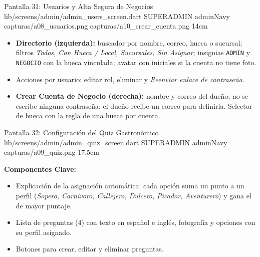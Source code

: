 \pantalladoble
  {Pantalla 31: Usuarios y Alta Segura de Negocios}
  {lib/screens/admin/admin_users_screen.dart}
  {SUPERADMIN}
  {adminNavy}
  {capturas/a08_usuarios.png}
  {capturas/a10_crear_cuenta.png}
  {14cm}
  {
    \begin{itemize}[leftmargin=*, itemsep=2pt]
      \item \textbf{Directorio (izquierda):} buscador por nombre, correo, hueca o sucursal; filtros \textit{Todos, Con Hueca / Local, Sucursales, Sin Asignar}; insignias \texttt{ADMIN} y \texttt{NEGOCIO} con la hueca vinculada; avatar con iniciales si la cuenta no tiene foto.
      \item Acciones por usuario: editar rol, eliminar y \textit{Reenviar enlace de contraseña}.
      \item \textbf{Crear Cuenta de Negocio (derecha):} nombre y correo del dueño; no se escribe ninguna contraseña: el dueño recibe un correo para definirla. Selector de hueca con la regla de una hueca por cuenta.
    \end{itemize}
  }

\pantallashowcase
  {Pantalla 32: Configuración del Quiz Gastronómico}
  {lib/screens/admin/admin_quiz_screen.dart}
  {SUPERADMIN}
  {adminNavy}
  {capturas/a09_quiz.png}
  {17.5cm}
  {

    \textbf{Componentes Clave:}
    \begin{itemize}[leftmargin=*, itemsep=2pt]
      \item Explicación de la asignación automática: cada opción suma un punto a un perfil (\textit{Sopero, Carnívoro, Callejero, Dulcero, Picador, Aventurero}) y gana el de mayor puntaje.
      \item Lista de preguntas (4) con texto en español e inglés, fotografía y opciones con su perfil asignado.
      \item Botones para crear, editar y eliminar preguntas.
    \end{itemize}
  }
